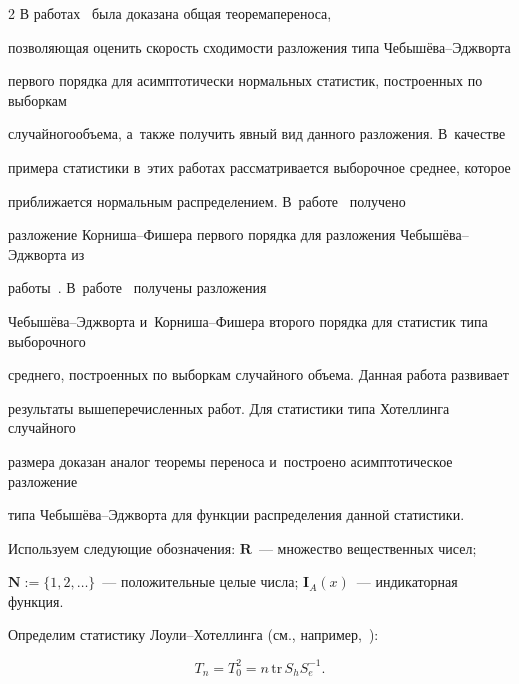 \begin{multicols}{2}
В работах~\cite{BenKorGal13,BenKorGal12} была доказана общая тео\-ре\-ма\linebreak переноса, 


позволяющая оценить ско\-рость сходимости разложения типа Че\-бы\-шё\-ва--Эдж\-вор\-та 


первого порядка для асимптотически нормальных статистик, построенных по выборкам 


случайного\linebreak объема, а~также получить явный вид данного разложения. В~качестве 


примера статистики в~этих работах рассматривается выборочное среднее, которое 


приближается нормальным распределением. В~работе~\cite{MMU16} получено 


разложение Кор\-ни\-ша--Фи\-ше\-ра первого порядка для разложения Че\-бы\-шё\-ва--Эдж\-вор\-та из 


работы~\cite{BenKorGal13}. В~работе~\cite{CMU} получены разложения 


Че\-бы\-шё\-ва--Эдж\-вор\-та и~Кор\-ни\-ша--Фи\-ше\-ра второго порядка для статистик типа выборочного 


среднего, построенных по выборкам случайного объема. Данная работа развивает 


результаты вышеперечисленных работ. Для статистики типа Хотеллинга случайного 


размера доказан аналог теоремы переноса и~построено асимптотическое разложение 


типа Че\-бы\-шё\-ва--Эдж\-вор\-та для функции распределения данной статистики.





Используем следующие обозначения: $\mathbf{R}$~--- множество вещественных чисел;


$\mathbf{N}:=\{1,2,\ldots\}$~--- положительные целые числа; $\mathbf{I}_{A}(x)$~--- индикаторная функция.





Определим статистику Лоу\-ли--Хо\-тел\-лин\-га (см., например,~\cite{UAF2016}):


\begin{equation}


\label{hotel}


T_n=T^2_0=n\,\mathrm{tr}\,S_h S_e^{-1}.


\end{equation}



\end{multicols}
